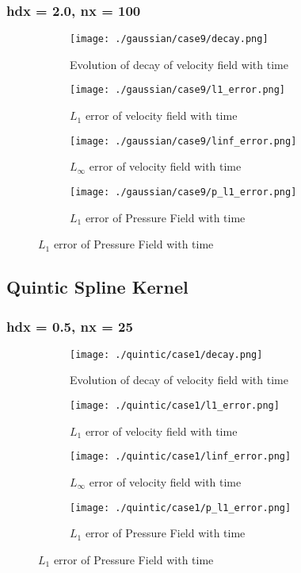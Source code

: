 \documentclass[11pt, a4paper]{article}
\begin{document}
\subsubsection{hdx = 2.0, nx = 100}
\begin{figure}[H]
\begin{subfigure}{0.48\textwidth}
\texttt{[image: ./gaussian/case9/decay.png]}
\caption{Evolution of decay of velocity field with time}
\end{subfigure}
\begin{subfigure}{0.48\textwidth}
\texttt{[image: ./gaussian/case9/l1\_error.png]}
\caption{$L_1$ error of velocity field with time}
\end{subfigure}
\medskip
\begin{subfigure}{0.48\textwidth}
\texttt{[image: ./gaussian/case9/linf\_error.png]}
\caption{$L_\infty$ error of velocity field with time}
\end{subfigure}
\begin{subfigure}{0.48\textwidth}
\texttt{[image: ./gaussian/case9/p\_l1\_error.png]}
\caption{$L_1$ error of Pressure Field with time}
\end{subfigure}
\end{figure}

\subsection{Quintic Spline Kernel}
\subsubsection{hdx = 0.5, nx = 25}
\begin{figure}[H]
\begin{subfigure}{0.48\textwidth}
\texttt{[image: ./quintic/case1/decay.png]}
\caption{Evolution of decay of velocity field with time}
\end{subfigure}
\begin{subfigure}{0.48\textwidth}
\texttt{[image: ./quintic/case1/l1\_error.png]}
\caption{$L_1$ error of velocity field with time}
\end{subfigure}
\medskip
\begin{subfigure}{0.48\textwidth}
\texttt{[image: ./quintic/case1/linf\_error.png]}
\caption{$L_\infty$ error of velocity field with time}
\end{subfigure}
\begin{subfigure}{0.48\textwidth}
\texttt{[image: ./quintic/case1/p\_l1\_error.png]}
\caption{$L_1$ error of Pressure Field with time}
\end{subfigure}
\end{figure}
\end{document}
